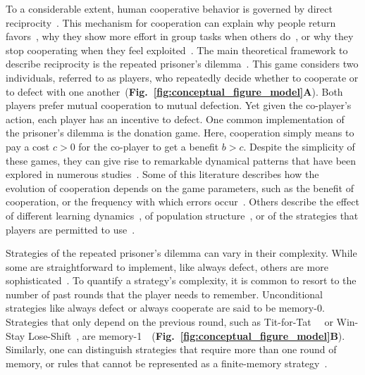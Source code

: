 \documentclass[11pt]{article}
\newcommand{\figref}[1]{{\textbf{Fig.~\ref{#1}}}}
\begin{document}
To a considerable extent, human cooperative behavior is governed by direct reciprocity~\cite{melis:ptrs:2010,rand:TCS:2013}. 
This mechanism for cooperation can explain why people return favors~\citep{neilson:JEBO:1999}, why they show more effort in group tasks when others do~\citep{fischbacher:AER:2010}, or why they stop cooperating when they feel exploited~\citep{hilbe:ncomms:2014,Xu:NComms:2016}. 
The main theoretical framework to describe reciprocity is the repeated prisoner's dilemma~\cite{axelrod:AAAS:1981, nowak:Science:2006, sigmund2010,Garcia:FRAI:2018,hilbe:Nature:2018}. 
This game considers two individuals, referred to as players, who repeatedly decide whether to cooperate or to defect with one another~(\figref{fig:conceptual_figure_model}\textbf{A}). 
Both players prefer mutual cooperation to mutual defection. 
Yet given the co-player's action, each player has an incentive to defect. 
One common implementation of the prisoner's dilemma is the donation game. 
Here, cooperation simply means to pay a cost $c\!>\!0$ for the co-player to get a benefit $b\!>\!c$. 
Despite the simplicity of these games, they can give rise to remarkable dynamical patterns that have been explored in numerous studies~\citep{frean:PRSB:1994,killingback:PRSB:1999,hauert:JTB:2002b,garcia:jet:2016,mcavoy:PRSA:2019,Kraines:TaD:1989,nowak:Nature:1993,imhof:PNAS:2005,grujic:jtb:2012,van-segbroeck:prl:2012,press:PNAS:2012,stewart:pnas:2013,Toupo:IJBC:2014,stewart:pnas:2014, akin:EGADS:2016,glynatsi:scientific:2020,chen:PNASnexus:2023}.
Some of this literature describes how the evolution of cooperation depends on the game parameters, such as the benefit of cooperation, or the frequency with which errors occur~\citep{boyd:JTB:1989,Hao:PRE:2015,Zhang:GEB:2018,Mamiya:PRE:2020}. 
Others describe the effect of different learning dynamics~\citep{stewart:games:2015,Mcavoy:PNAS:2022}, of population structure~\citep{brauchli:JTB:1999,szabo:PRE:2000b,allen:AmNat:2013,szolnoki:scirep:2014}, or of the strategies that players are permitted to use~\citep{baek:scientific:2016}.  

Strategies of the repeated prisoner's dilemma can vary in their complexity.
While some are straightforward to implement, like always defect, others are more sophisticated~\cite{harper:PLOSONE:2017, knight:PLOSONE:2018}.
To quantify a strategy's complexity, it is common to resort to the number of past rounds that the player needs to remember. 
Unconditional strategies like always defect or always cooperate are said to be \mbox{memory-0}. 
Strategies that only depend on the previous round, such as Tit-for-Tat~~\cite{axelrod:AAAS:1981,Duersch:IJGT:2013} or Win-Stay Lose-Shift~\cite{Kraines:TaD:1989,nowak:Nature:1993}, are \mbox{memory-1}~~(\figref{fig:conceptual_figure_model}\textbf{B}). 
Similarly, one can distinguish strategies that require more than one round of memory, or rules that cannot be represented as a finite-memory strategy~\cite{Garcia:FRAI:2018}. 
\end{document}
